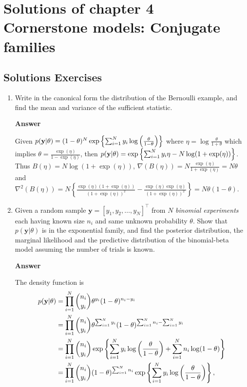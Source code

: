 \chapter{Solutions of chapter 4\\
Cornerstone models: Conjugate families}\label{chap4}

\section{Solutions Exercises}\label{sec1}
\begin{enumerate}[leftmargin=*]
\item Write in the canonical form the distribution of the Bernoulli example, and find the mean and variance of the sufficient statistic.

\textbf{Answer}

Given $p({\bf{y}}|\theta)=(1-\theta)^N\exp\left\{\sum_{i=1}^N y_i\log\left(\frac{\theta}{1-\theta}\right)\right\}$ where $\eta=\log\frac{\theta}{1+\theta}$ which implies $\theta=\frac{\exp(\eta)}{1-\exp(\eta)}$, then $p({\bf{y}}|\theta)=\exp\left\{\sum_{i=1}^N y_i\eta-N\log(1+\exp(\eta))\right\}$. Thus $B(\eta)=N\log(1+\exp(\eta))$, $\nabla(B(\eta))=N\frac{\exp(\eta)}{1+\exp(\eta)}=N\theta$ and $\nabla^2(B(\eta))=N\left\{\frac{\exp(\eta)(1+\exp(\eta))}{(1+\exp(\eta))^2}-\frac{\exp(\eta)\exp(\eta)}{(1+\exp(\eta))^2}\right\}=N\theta(1-\theta)$. 



\item Given a random sample $\mathbf{y}=[y_1,y_2,\dots,y_N]^{\top}$ from $N$ \textit{binomial experiments} each having known size $n_i$ and same unknown probability $\theta$. Show that $p(\mathbf{y}|\theta)$ is in the exponential family, and find the posterior distribution, the marginal likelihood and the predictive distribution of the binomial-beta model assuming the number of trials is known.

\textbf{Answer}

The density function is 
\begin{align*}
p({\bf{y}}|\theta)&=\prod_{i=1}^N{n_i \choose y_i}\theta^{y_i}(1-\theta)^{n_i-y_i}\\
&=\prod_{i=1}^N{n_i \choose y_i}\theta^{\sum_{i=1}^Ny_i}(1-\theta)^{\sum_{i=1}^N n_i-\sum_{i=1}^N y_i}\\
&=\prod_{i=1}^N{n_i \choose y_i}\exp\left\{\sum_{i=1}^N y_i\log\left(\frac{\theta}{1-\theta}\right)+\sum_{i=1}^N n_i\log(1-\theta)\right\}\\
&=\prod_{i=1}^N{n_i \choose y_i}(1-\theta)^{\sum_{i=1}^N n_i}\exp\left\{\sum_{i=1}^N y_i\log\left(\frac{\theta}{1-\theta}\right)\right\},
\end{align*}
 

\end{enumerate}
